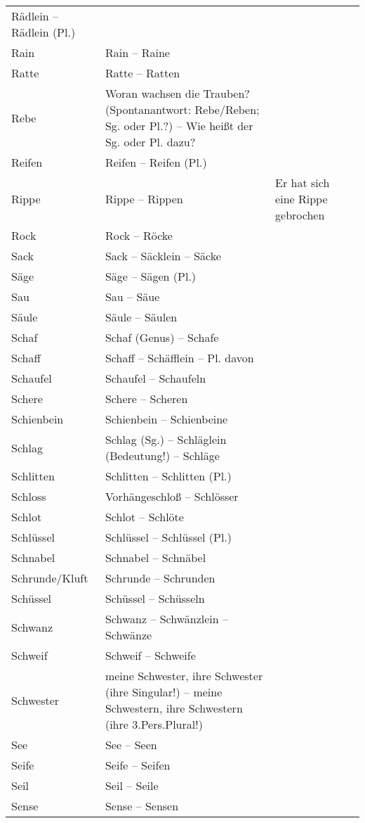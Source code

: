 {\begin{xltabular}{\textwidth}{>{\raggedright\arraybackslash}p{.15\textwidth}QQQ}
Rädlein -- Rädlein (Pl.) &  & \\
Rain & Rain -- Raine &  & \\
Ratte & Ratte -- Ratten &  & \\
Rebe & Woran wachsen die Trauben? (Spontanantwort: Rebe\slash Reben; Sg. oder Pl.?) -- Wie heißt der Sg. oder Pl. dazu? &  & \\
Reifen & Reifen -- Reifen (Pl.) &  & \\
Rippe & Rippe -- Rippen & Er hat sich eine Rippe gebrochen & \\
Rock & Rock -- Röcke &  & \\
Sack & Sack -- Säcklein -- Säcke &  & \\
Säge & Säge -- Sägen (Pl.) &  & \\
Sau & Sau -- Säue &  & \\
Säule & Säule -- Säulen &  & \\
Schaf & Schaf (Genus) -- Schafe &  & \\
Schaff & Schaff -- Schäfflein -- Pl. davon &  & \\
Schaufel & Schaufel -- Schaufeln &  & \\
Schere & Schere -- Scheren &  & \\
Schienbein & Schienbein -- Schienbeine &  & \\
Schlag & Schlag (Sg.) -- Schläglein (Bedeutung!) -- Schläge &  & \\
Schlitten & Schlitten -- Schlitten (Pl.) &  & \\
Schloss & Vorhängeschloß -- Schlösser &  & \\
Schlot & Schlot -- Schlöte &  & \\
Schlüssel & Schlüssel -- Schlüssel (Pl.) &  & \\
Schnabel & Schnabel -- Schnäbel &  & \\
Schrunde\slash Kluft & Schrunde -- Schrunden &  & \\
Schüssel & Schüssel -- Schüsseln &  & \\
Schwanz & Schwanz -- Schwänzlein -- Schwänze &  & \\
Schweif & Schweif -- Schweife &  & \\
Schwester & meine Schwester, ihre Schwester (ihre Singular!) -- meine Schwestern, ihre Schwestern (ihre 3.Pers.Plural!) &  & \\
See & See -- Seen &  & \\
Seife & Seife -- Seifen &  & \\
Seil & Seil -- Seile &  & \\
Sense & Sense -- Sensen &  & \\

\end{xltabular}}
